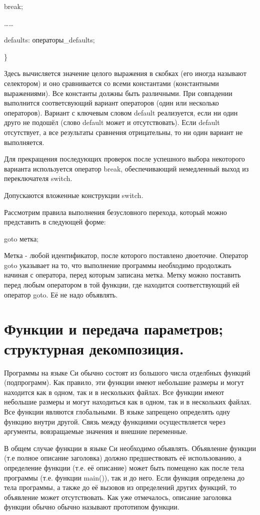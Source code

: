 \documentclass[a4paper, fontsize=10bp]{article} %
\begin{document}
\qquad break;

\dots \qquad \dots \qquad

defaults: операторы\_defaults;

\noindent \}

\noindent Здесь вычисляется значение целого выражения в скобках (его иногда называют селектором) и оно
сравнивается со всеми константами (константными выражениями). Все константы должны быть 
различными. При совпадении выполнится соответсвующий вариант операторов (один или несколько 
операторов). Вариант с ключевым словом default реализуется, если ни один друго не подошёл (слово 
default может и отсутствовать). Если default отсутствует, а все результаты сравнения отрицательны, то ни
один вариант не выполняется.

\noindent Для прекращения последующих проверок после успешного выбора некоторого варианта используется
оператор break, обеспечивающий немедленный выход из переключателя switch.

\noindent Допускаются вложенные конструкции switch.

\noindent Рассмотрим правила выполнения безусловного перехода, который можно представить в следующей форме:

goto метка;

\noindent Метка - любой идентификатор, после которого поставлено двоеточие. Оператор goto указывает на то,
что выполнение программы необходимо продолжать начиная с оператора, перед которым записана метка.
Метку можно поставить перед любым оператором в той функции, где находится соответствующий ей 
оператор goto. Её не надо объявлять.



\section{Функции и передача параметров; структурная декомпозиция.}

\noindent Программы на языке Си обычно состоят из большого числа отделбных функций (подпрограмм). Как правило,
эти функции имеют небольшие размеры и могут находится как в одном, так и в нескольких файлах. Все
функции имеют небольшие размеры и могут находиться как в одном, так и в нескольких файлах. Все
функции являются глобальными. В языке запрещено определять одну функцию внутри другой. Связь между
функциями осуществляется через аргументы, вовзращаемые значения и внешние переменные.

\noindent В общем случае функции в языке Си необходимо объявлять. Объявление функции (т.е полное описание заголовка)
должно предшествовать её использованию, а определение функции (т.е. её описание) может быть
помещено как после тела программы (т.е. функции main()), так и до него. Если функция определена до тела
программы, а также до её вызовов из определений других функций, то объявление может отсутствовать. Как
уже отмечалось, описание заголовка функции обычно обычно называют прототипом функции.
\end{document}
